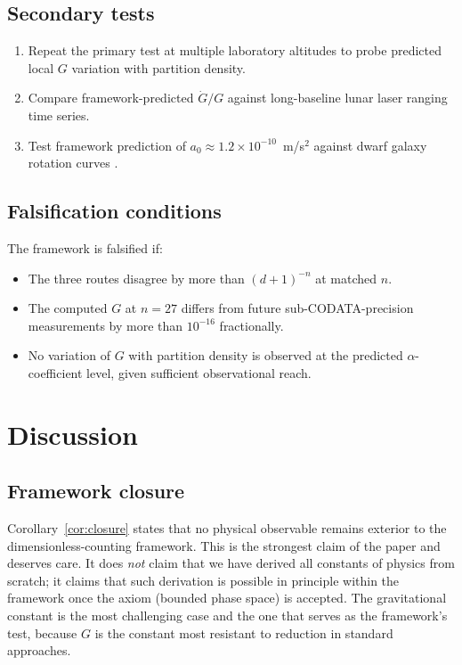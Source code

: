 \documentclass[11pt,twocolumn,a4paper]{article}
\theoremstyle{definition}
\theoremstyle{remark}
\newcommand{\Gnewton}{G}
\begin{document}
\subsection{Secondary tests}

\begin{enumerate}[nosep]
\item Repeat the primary test at multiple laboratory altitudes to probe predicted local $\Gnewton$ variation with partition density.
\item Compare framework-predicted $\dot\Gnewton/\Gnewton$ against long-baseline lunar laser ranging time series.
\item Test framework prediction of $a_0 \approx 1.2\times 10^{-10}$~m/s$^2$ against dwarf galaxy rotation curves \citep{mcgaugh2016}.
\end{enumerate}

\subsection{Falsification conditions}

The framework is falsified if:
\begin{itemize}[nosep]
\item The three routes disagree by more than ${(d+1)}^{-n}$ at matched $n$.
\item The computed $\Gnewton$ at $n = 27$ differs from future sub-CODATA-precision measurements by more than $10^{-16}$ fractionally.
\item No variation of $\Gnewton$ with partition density is observed at the predicted $\alpha$-coefficient level, given sufficient observational reach.
\end{itemize}

\section{Discussion}
\label{sec:discussion}

\subsection{Framework closure}

Corollary~\ref{cor:closure} states that no physical observable remains exterior to the dimensionless-counting framework. This is the strongest claim of the paper and deserves care. It does \emph{not} claim that we have derived all constants of physics from scratch; it claims that such derivation is possible in principle within the framework once the axiom (bounded phase space) is accepted. The gravitational constant is the most challenging case and the one that serves as the framework's test, because $\Gnewton$ is the constant most resistant to reduction in standard approaches.
\end{document}
